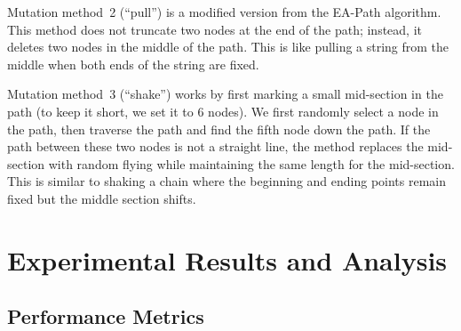 \documentclass[letterpaper, 10 pt, conference]{ieeeconf}
\begin{document}
Mutation method~2 (``pull'') is a modified version from the EA-Path algorithm. This method does not truncate two nodes at the end of the path; instead, it deletes two nodes in the middle of the path. This is like pulling a string from the middle when both ends of the string are fixed.

Mutation method~3 (``shake'') works by first marking a small mid-section in the path (to keep it short, we set it to 6 nodes). We first randomly select a node in the path, then traverse the path and find the fifth node down the path. If the path between these two nodes is not a straight line, the method replaces the mid-section with random flying while maintaining the same length for the mid-section. This is similar to shaking a chain where the beginning and ending points remain fixed but the middle section shifts.



\section{Experimental Results and Analysis}

\subsection{Performance Metrics}
\end{document}

